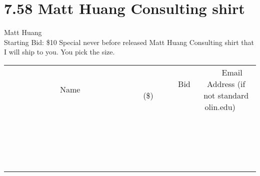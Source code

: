 \documentclass[11pt]{article}
\begin{document}
\section*{7.58 Matt Huang Consulting shirt}
Matt Huang
\\
Starting Bid: \$10
\newline
Special never before released Matt Huang Consulting shirt that I will ship to you. You pick the size.
\\[3ex]
\begin{tabular}{c c c}
~~~~~~~~~~~~~Name~~~~~~~~~~~~~ & ~~~~~~~~~Bid (\$)~~~~~~~~~  & ~~~Email Address (if not standard olin.edu)~~~\\
 & & \\
\hline
 & & \\
\hline
 & & \\
\hline
 & & \\
\hline
 & & \\
\hline
 & & \\
\hline
 & & \\
\hline
 & & \\
\hline
 & & \\
\hline
 & & \\
\hline
 & & \\
\hline
 & & \\
\hline
 & & \\
\hline
 & & \\
\hline
 & & \\
\hline
 & & \\
\hline
 & & \\
\hline
 & & \\
\hline
 & & \\
\hline
\end{tabular}
\newpage
\end{document}
